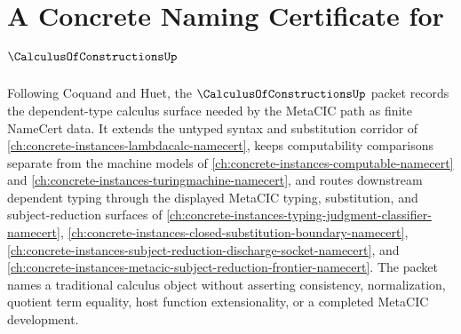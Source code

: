 \chapter{A Concrete Naming Certificate for $\CalculusOfConstructionsUp$}
\label{ch:concrete-instances-calculus-of-constructions-namecert}

Following Coquand and Huet, the $\CalculusOfConstructionsUp$ packet records the dependent-type calculus surface needed by the MetaCIC path as finite NameCert data. It extends the untyped syntax and substitution corridor of \autoref{ch:concrete-instances-lambdacalc-namecert}, keeps computability comparisons separate from the machine models of \autoref{ch:concrete-instances-computable-namecert} and \autoref{ch:concrete-instances-turingmachine-namecert}, and routes downstream dependent typing through the displayed MetaCIC typing, substitution, and subject-reduction surfaces of \autoref{ch:concrete-instances-typing-judgment-classifier-namecert}, \autoref{ch:concrete-instances-closed-substitution-boundary-namecert}, \autoref{ch:concrete-instances-subject-reduction-discharge-socket-namecert}, and \autoref{ch:concrete-instances-metacic-subject-reduction-frontier-namecert}. The packet names a traditional calculus object without asserting consistency, normalization, quotient term equality, host function extensionality, or a completed MetaCIC development.

